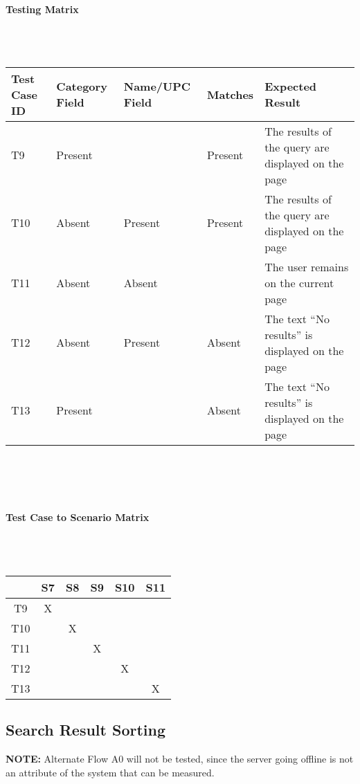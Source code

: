 \documentclass{article}
\begin{document}
\paragraph{Testing Matrix}~\\ \\
\begin{tabular}{ p{0.8in}  p{0.5in} p{0.7in}  p{0.5in}  p{3in} }
\hline
Test Case ID & Category Field & Name/UPC Field & Matches & Expected Result\\
\hline
\hline
T9 & Present &  & Present & The results of the query are displayed on the page\\
\hline
T10 & Absent & Present & Present & The results of the query are displayed on the page\\
\hline
T11 & Absent & Absent &  & The user remains on the current page\\
\hline
T12 & Absent & Present & Absent & The text ``No results'' is displayed on the page\\
\hline
T13 & Present &  & Absent & The text ``No results'' is displayed on the page\\
\hline
\end{tabular}\\
~\\
~\\
\paragraph{Test Case to Scenario Matrix}~\\ \\
\begin{tabular}{ | c || c | c | c | c | c | }
\hline
    & S7  & S8  & S9  & S10 & S11 \\
\hline
\hline
T9  &  X  &     &     &     &     \\
\hline
T10 &     &  X  &     &     &     \\
\hline
T11 &     &     &  X  &     &     \\
\hline
T12 &     &     &     &  X  &     \\
\hline
T13 &     &     &     &     &  X  \\
\hline
\end{tabular}

\subsection{Search Result Sorting}
\textbf{NOTE:} Alternate Flow A0 will not be tested, since the server going offline is not an attribute of the system that can be measured.
\end{document}
